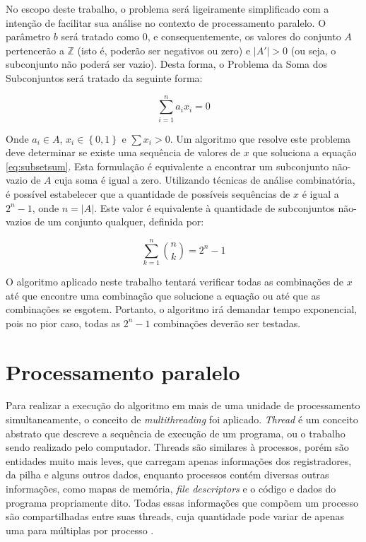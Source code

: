 \documentclass[12pt]{article}
\begin{document}
No escopo deste trabalho, o problema será ligeiramente simplificado com a intenção de facilitar sua análise no contexto de processamento paralelo. O parâmetro $b$ será tratado como 0, e consequentemente, os valores do conjunto $A$ pertencerão a $\mathbb{Z}$ (isto é, poderão ser negativos ou zero) e $\left | A' \right | > 0$ (ou seja, o subconjunto não poderá ser vazio). Desta forma, o Problema da Soma dos Subconjuntos será tratado da seguinte forma:

\begin{equation} \label{eq:subsetsum}
    \sum_{i = 1}^{n} a_{i} x_{i} = 0
\end{equation}

Onde $a_{i} \in A$, $x_{i} \in \left\{0, 1\right\}$ e $\sum x_{i} > 0$. Um algoritmo que resolve este problema deve determinar se existe uma sequência de valores de $x$ que soluciona a equação \ref{eq:subsetsum}. Esta formulação é equivalente a encontrar um subconjunto não-vazio de $A$ cuja soma é igual a zero. Utilizando técnicas de análise combinatória, é possível estabelecer que a quantidade de possíveis sequências de $x$ é igual a $2^{n} - 1$, onde $n = \left | A \right |$. Este valor é equivalente à quantidade de subconjuntos não-vazios de um conjunto qualquer, definida por:

\begin{equation} \label{eq:subsetcount}
    \sum_{k = 1}^{n} \binom{n}{k} = 2^{n} - 1
\end{equation}

O algoritmo aplicado neste trabalho tentará verificar todas as combinações de $x$ até que encontre uma combinação que solucione a equação ou até que as combinações se esgotem. Portanto, o algoritmo irá demandar tempo exponencial, pois no pior caso, todas as $2^{n} - 1$ combinações deverão ser testadas.

\section{Processamento paralelo} \label{sec:parallel}

Para realizar a execução do algoritmo em mais de uma unidade de processamento simultaneamente, o conceito de \textit{multithreading} foi aplicado. \textit{Thread} é um conceito abstrato que descreve a sequência de execução de um programa, ou o trabalho sendo realizado pelo computador. Threads são similares à processos, porém são entidades muito mais leves, que carregam apenas informações dos registradores, da pilha e alguns outros dados, enquanto processos contém diversas outras informações, como mapas de memória, \textit{file descriptors} e o código e dados do programa propriamente dito. Todas essas informações que compõem um processo são compartilhadas entre suas threads, cuja quantidade pode variar de apenas uma para múltiplas por processo \cite{Lewis1996}.
\end{document}
